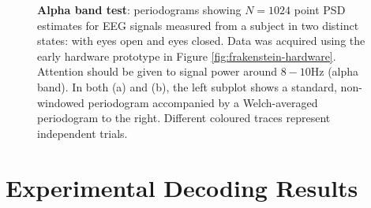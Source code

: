 \begin{figure}[htp]

\caption[Alpha band test: periodograms showing $N=1024$ point PSD estimates for EEG signals measured from a subject in two distinct states: with eyes open and eyes closed.]{\textbf{Alpha band test}: periodograms showing $N=1024$ point PSD estimates for EEG signals measured from a subject in two distinct states: with eyes open and eyes closed. Data was acquired using the early hardware prototype in Figure \ref{fig:frakenstein-hardware}. Attention should be given to signal power around $8-10$Hz (alpha band). In both (a) and (b), the left subplot shows a standard, non-windowed periodogram accompanied by a Welch-averaged periodogram to the right. Different coloured traces represent independent trials.}
\end{figure}


\section{Experimental Decoding Results}

